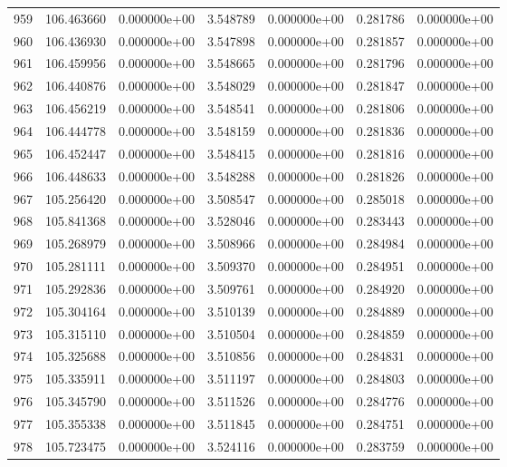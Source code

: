 \begin{tabular}{rrrrrrr}
 959 & 106.463660 &  0.000000e+00 &  3.548789 &  0.000000e+00 &    0.281786 &  0.000000e+00 \\
 960 & 106.436930 &  0.000000e+00 &  3.547898 &  0.000000e+00 &    0.281857 &  0.000000e+00 \\
 961 & 106.459956 &  0.000000e+00 &  3.548665 &  0.000000e+00 &    0.281796 &  0.000000e+00 \\
 962 & 106.440876 &  0.000000e+00 &  3.548029 &  0.000000e+00 &    0.281847 &  0.000000e+00 \\
 963 & 106.456219 &  0.000000e+00 &  3.548541 &  0.000000e+00 &    0.281806 &  0.000000e+00 \\
 964 & 106.444778 &  0.000000e+00 &  3.548159 &  0.000000e+00 &    0.281836 &  0.000000e+00 \\
 965 & 106.452447 &  0.000000e+00 &  3.548415 &  0.000000e+00 &    0.281816 &  0.000000e+00 \\
 966 & 106.448633 &  0.000000e+00 &  3.548288 &  0.000000e+00 &    0.281826 &  0.000000e+00 \\
 967 & 105.256420 &  0.000000e+00 &  3.508547 &  0.000000e+00 &    0.285018 &  0.000000e+00 \\
 968 & 105.841368 &  0.000000e+00 &  3.528046 &  0.000000e+00 &    0.283443 &  0.000000e+00 \\
 969 & 105.268979 &  0.000000e+00 &  3.508966 &  0.000000e+00 &    0.284984 &  0.000000e+00 \\
 970 & 105.281111 &  0.000000e+00 &  3.509370 &  0.000000e+00 &    0.284951 &  0.000000e+00 \\
 971 & 105.292836 &  0.000000e+00 &  3.509761 &  0.000000e+00 &    0.284920 &  0.000000e+00 \\
 972 & 105.304164 &  0.000000e+00 &  3.510139 &  0.000000e+00 &    0.284889 &  0.000000e+00 \\
 973 & 105.315110 &  0.000000e+00 &  3.510504 &  0.000000e+00 &    0.284859 &  0.000000e+00 \\
 974 & 105.325688 &  0.000000e+00 &  3.510856 &  0.000000e+00 &    0.284831 &  0.000000e+00 \\
 975 & 105.335911 &  0.000000e+00 &  3.511197 &  0.000000e+00 &    0.284803 &  0.000000e+00 \\
 976 & 105.345790 &  0.000000e+00 &  3.511526 &  0.000000e+00 &    0.284776 &  0.000000e+00 \\
 977 & 105.355338 &  0.000000e+00 &  3.511845 &  0.000000e+00 &    0.284751 &  0.000000e+00 \\
 978 & 105.723475 &  0.000000e+00 &  3.524116 &  0.000000e+00 &    0.283759 &  0.000000e+00 \\

\end{tabular}
